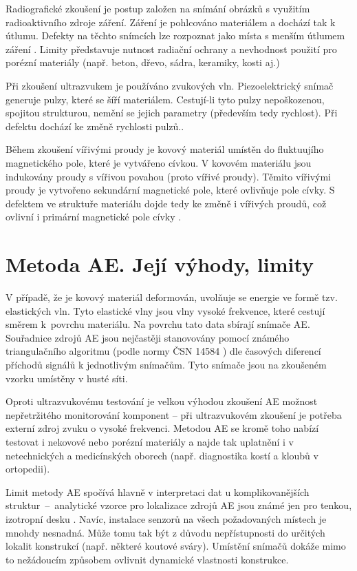 Radiografické zkoušení je postup založen na snímání obrázků s využitím radioaktivního zdroje záření. Záření je pohlcováno materiálem a dochází tak k útlumu. Defekty na těchto snímcích lze rozpoznat jako místa s menším útlumem záření \cite{Gupta_ADVANCES_IN_MATERIALS_AND_PROCESSING_TECHNOLOGIES}. Limity představuje nutnost radiační ochrany a nevhodnost použití pro porézní materiály (např. beton, dřevo, sádra, keramiky, kosti aj.) \cite{Sandeep_Kumar_Dwivedi_NDT}

Při zkoušení ultrazvukem je používáno zvukových vln. Piezoelektrický snímač generuje pulzy, které se šíří materiálem. Cestují-li tyto pulzy nepoškozenou, spojitou strukturou, nemění se jejich parametry (především tedy rychlost). Při defektu dochází ke změně rychlosti pulzů.\cite{Gupta_ADVANCES_IN_MATERIALS_AND_PROCESSING_TECHNOLOGIES}. 

Během zkoušení vířivými proudy je kovový materiál umístěn do fluktuujího magnetického pole, které je vytvářeno cívkou. V kovovém materiálu jsou indukovány proudy s vířivou povahou (proto vířivé proudy). Těmito vířivými proudy je vytvořeno sekundární magnetické pole, které ovlivňuje pole cívky. S defektem ve struktuře materiálu dojde tedy ke změně i vířivých proudů, což ovlivní i primární magnetické pole cívky \cite{Gupta_ADVANCES_IN_MATERIALS_AND_PROCESSING_TECHNOLOGIES}. 
\section{Metoda AE. Její výhody, limity}
V případě, že je kovový materiál deformován, uvolňuje se energie ve formě tzv. elastických vln. Tyto elastické vlny jsou vlny vysoké frekvence, které cestují směrem k~povrchu materiálu. Na povrchu tato data sbírají snímače AE. Souřadnice zdrojů AE jsou nejčastěji stanovovány pomocí známého triangulačního algoritmu (podle normy ČSN 14584 \cite{čsn14584}) dle časových diferencí příchodů signálů k jednotlivým snímačům. Tyto snímače jsou na zkoušeném vzorku umístěny v husté síti.

Oproti ultrazvukovému testování je velkou výhodou zkoušení AE možnost nepřetržitého monitorování komponent – při ultrazvukovém zkoušení je potřeba externí zdroj zvuku o vysoké frekvenci. Metodou \ac{AE} se kromě toho nabízí testovat i nekovové nebo porézní materiály a najde tak uplatnění i v netechnických a medicínských oborech (např. diagnostika kostí a kloubů v ortopedii).

Limit metody AE spočívá hlavně v interpretaci dat u komplikovanějších struktur~–~analytické vzorce pro lokalizace zdrojů AE jsou známé jen pro tenkou, izotropní desku \cite{Chlada2009}. Navíc, instalace senzorů na všech požadovaných místech je mnohdy nesnadná. Může tomu tak být z důvodu nepřístupnosti do určitých lokalit konstrukcí (např. některé koutové sváry). Umístění snímačů dokáže mimo to nežádoucím způsobem ovlivnit dynamické vlastnosti konstrukce. %
